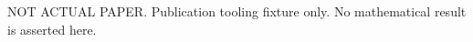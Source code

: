 \documentclass{article}
\begin{document}
NOT ACTUAL PAPER. Publication tooling fixture only. No mathematical result is asserted here.
\end{document}
